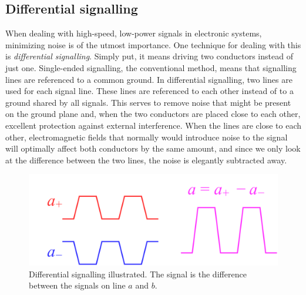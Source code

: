 





\subsection{Differential signalling}

When dealing with high-speed, low-power signals in electronic systems, minimizing noise is of the utmost importance. One technique for dealing with this is \emph{differential signalling}. Simply put, it means driving two conductors instead of just one. Single-ended signalling, the conventional method, means that signalling lines are referenced to a common ground. In differential signalling, two lines are used for each signal line. These lines are referenced to each other instead of to a ground shared by all signals. This serves to remove noise that might be present on the ground plane and, when the two conductors are placed close to each other, excellent protection against external interference. When the lines are close to each other, electromagnetic fields that normally would introduce noise to the signal will optimally affect both conductors by the same amount, and since we only look at the difference between the two lines, the noise is elegantly subtracted away.

\begin{figure}[H]
    \centering
    \includegraphics[width=.75\textwidth]{media/diffsig.png}
    \caption{Differential signalling illustrated. The signal is the difference between the signals on line $a$ and $b$.}
    \label{fig:diffsig}
\end{figure}

